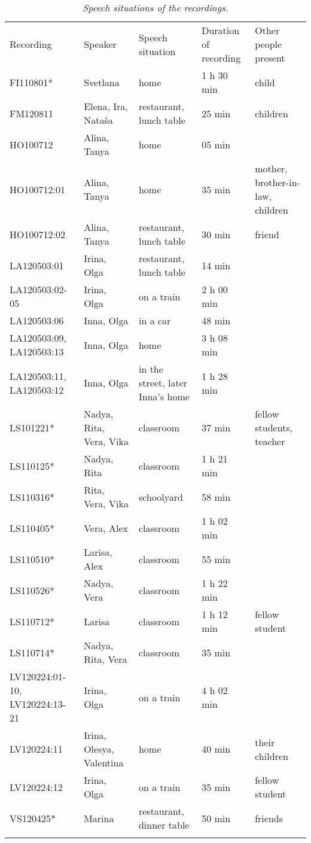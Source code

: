 \begin{table} 
\begin{small}
		\begin{tabular}{p{6.5em}<{\raggedright}p{5.5em}<{\raggedright}p{5.5em}<{\raggedright}p{5.5em}<{\raggedleft}p{6.5em}<{\raggedright}} \midrule
			\addlinespace[2mm]
			Recording	& Speaker	& Speech situation & Duration of recording & Other people present\\ \addlinespace[2mm] \midrule
			\addlinespace[2mm]
	FI110801* & Svetlana	& home & 1 h 30 min & child\\
    FM120811 &Elena, Ira, Nataša & restaurant, lunch table & 25 min &children\\
    HO100712 & Alina, Tanya	& home & 05 min & \\
    HO100712:01	& Alina, Tanya	& home & 35 min & mother, brother-in-law, children\\
    HO100712:02	& Alina, Tanya & restaurant, lunch table & 30 min  & friend\\
    LA120503:01	& Irina, Olga &restaurant, lunch table & 14 min & \\
    LA120503:02-05 &Irina, Olga &on a train & 2 h 00 min & \\
    LA120503:06	&Inna, Olga	&in a car &48 min &\\
    LA120503:09, LA120503:13 &Inna, Olga &home &3 h 08 min\\
    LA120503:11, LA120503:12 &Inna, Olga &in the street, later Inna's home &1 h 28 min &\\
    LS101221* &Nadya, Rita, Vera, Vika & classroom &37 min &fellow students, teacher\\
    LS110125* &Nadya, Rita &classroom &1 h 21 min &\\
    LS110316* &Rita, Vera, Vika &schoolyard &58 min &\\
    LS110405* &Vera, Alex &classroom &1 h 02 min &\\
    LS110510* &Larisa, Alex &classroom &55 min &\\
    LS110526* &Nadya, Vera &classroom &1 h 22 min &\\
    LS110712* &Larisa &classroom &1 h 12 min &fellow student\\
    LS110714* &Nadya, Rita, Vera &classroom &35 min &\\
    LV120224:01-10, LV120224:13-21 &Irina, Olga &on a train &4 h 02 min &\\
    LV120224:11	&Irina, Olesya, Valentina &home &40 min &their children\\
    LV120224:12	&Irina, Olga &on a train &35 min &fellow student\\
    VS120425* &Marina &restaurant, dinner table &50 min &friends\\	\addlinespace[2mm]
		\midrule
	\end{tabular}
\end{small}
	\caption{\textit{Speech situations of the recordings.}}\label{tab:3:5}
\end{table}

